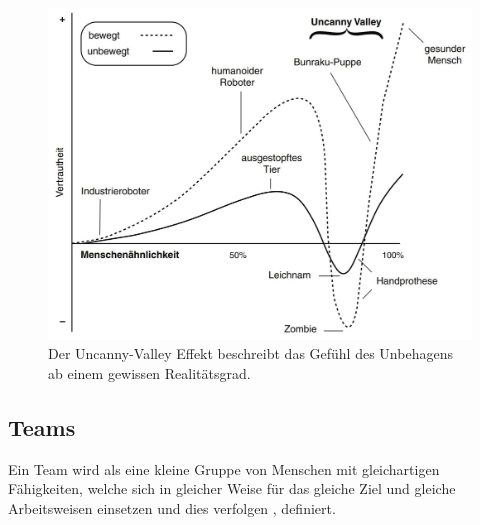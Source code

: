 \documentclass[a4paper,11pt]{article}%
\renewcommand{\\}{\vspace*{0.5\baselineskip} \newline}
\begin{document}
\begin{figure}[H]
		\begin{footnotesize}
		\begin{center}
			\includegraphics[scale=.45]{Abbildungen/Uncanny-Valley.JPG}	
			\caption[Der Uncanny-Valley Effekt]{Der Uncanny-Valley Effekt beschreibt das Gefühl des Unbehagens ab einem gewissen Realitätsgrad.}
			\label{Uncanny-Valley}
		\end{center}
		\end{footnotesize}
	\end{figure}	
%
\newpage

	\subsection{Teams}		
	\label{Teamwork}
\label{team}
	Ein Team wird als eine \glqq{}kleine Gruppe von Menschen mit gleichartigen Fähigkeiten, welche sich in gleicher Weise für das gleiche Ziel und gleiche Arbeitsweisen einsetzen und dies verfolgen\dq{} \citep[S. 2]{zenun2007effects}, definiert.
	
\end{document}
